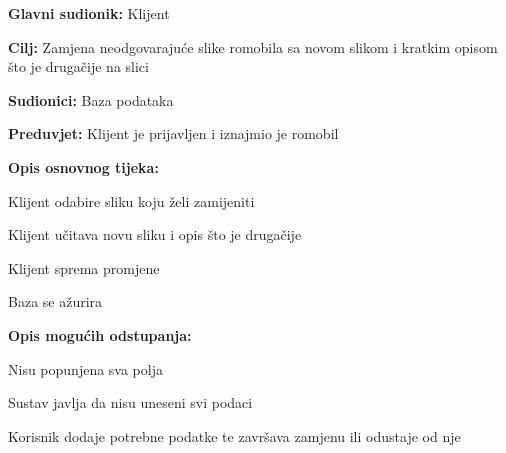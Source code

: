 						\noindent {}
					\begin{packed_item}
	
						\item \textbf{Glavni sudionik: }Klijent
						\item  \textbf{Cilj: }Zamjena neodgovarajuće slike romobila sa novom slikom i kratkim opisom što je drugačije na slici
						\item  \textbf{Sudionici: }Baza podataka
						\item  \textbf{Preduvjet: }Klijent je prijavljen i iznajmio je romobil
						\item  \textbf{Opis osnovnog tijeka:}
						
						\item[] \begin{packed_enum}
	
							\item Klijent odabire sliku koju želi zamijeniti
							\item Klijent učitava novu sliku i opis što je drugačije
							\item Klijent sprema promjene
							\item Baza se ažurira


						\end{packed_enum}
						
						\item  \textbf{Opis mogućih odstupanja:}
						
						\item[] \begin{packed_item}
	
							\item[2.a] Nisu popunjena sva polja
							\item[] \begin{packed_enum}
								
								\item Sustav javlja da nisu uneseni svi podaci
								\item Korisnik dodaje potrebne podatke te završava zamjenu ili odustaje od nje

							\end{packed_enum}
							
						\end{packed_item}						
					\end{packed_item}	




